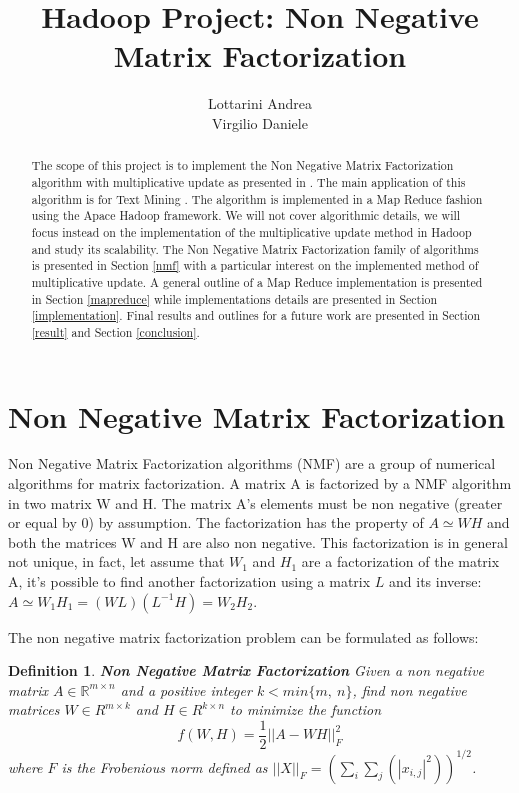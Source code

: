 \documentclass[a4paper,12pt]{article}
\title{Hadoop Project: Non Negative Matrix Factorization}
\author{Lottarini Andrea \\ Virgilio Daniele}
\newtheorem{mydef}{Definition}[section]
\begin{document}
\maketitle

\begin{abstract}

The scope of this project is to implement the Non Negative Matrix Factorization algorithm with multiplicative update as presented in \citep{liu2010}.
The main application of this algorithm is for Text Mining \cite{05abstractemail}.
The algorithm is implemented in a Map Reduce fashion using the Apace Hadoop framework.
We will not cover algorithmic details, we will focus instead on the implementation of the multiplicative update method in Hadoop and study its scalability.
The Non Negative Matrix Factorization family of algorithms is presented in Section \ref{nmf} with a particular interest on the  implemented method of multiplicative update. 
A general outline of a Map Reduce implementation is presented in Section \ref{mapreduce} while implementations details are presented in Section \ref{implementation}.
Final results and outlines for a future work are presented in Section \ref{result} and Section \ref{conclusion}.

\end{abstract}

\section{Non Negative Matrix Factorization}
\label{nmf}

Non Negative Matrix Factorization algorithms (NMF) are a group of numerical algorithms for matrix factorization.
A matrix A is factorized by a NMF algorithm in two matrix W and H. 
The matrix A's elements must be non negative (greater or equal by 0) by assumption. 
The factorization has the property of $ A \simeq W H $ and both the matrices W and H are also non negative. 
This factorization is in general not unique, in fact, let assume that $W_1$ and $H_1$ are a factorization of the matrix A, it's possible to find another factorization using a matrix $L$ and its inverse: $A \simeq W_1 H_1 = ( W L ) (L^{-1} H) = W_2 H_2  $. 

The non negative matrix factorization problem can be formulated as follows:
\begin{mydef} \textbf{Non Negative Matrix Factorization}
  Given a non negative matrix $A \in \mathbb{R}^{m×n}$ and a positive integer $k<min\{m,~n\} $, find non 	
  	negative matrices $W \in R^{m×k}$ and $H \in R^{k×n}$ to minimize the function  
  	$$ f ( W , H ) = \frac{1}{2} || A − W H ||_F^2$$ where $F$ is the Frobenious norm defined as
  	$|| X ||_F = ( \sum_i \sum_j( |x_{i,j}|^2 ) )^{1/2}$. 
  	\label{def:nmf}
\end{mydef}
\end{document}
